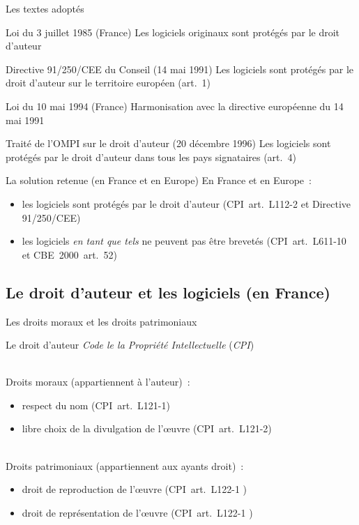\documentclass{beamer}
\begin{document}
\begin{frame}{Les textes adoptés}
    \begin{block}{Loi du 3 juillet 1985 (France)}
        Les logiciels \og{}originaux\fg{} sont protégés par le droit d'auteur
    \end{block}
    \begin{block}{Directive 91/250/CEE du Conseil (14 mai 1991)}
        Les logiciels sont protégés par le droit d'auteur sur le territoire européen (art.~1)
    \end{block}
    \begin{block}{Loi du 10 mai 1994 (France)}
        Harmonisation avec la directive européenne du 14 mai 1991
    \end{block}
    \begin{block}{Traité de l’OMPI sur le droit d’auteur (20 décembre 1996)}
        Les logiciels sont protégés par le droit d'auteur dans tous les pays signataires (art.~4)
    \end{block}
\end{frame}

\begin{frame}{La solution retenue (en France et en Europe)}
    En France et en Europe~:
    \begin{itemize}
        \item les logiciels sont protégés par le droit d'auteur (CPI~art.~L112-2 et Directive 91/250/CEE)
        \item les logiciels \emph{en tant que tels} ne peuvent pas être brevetés (CPI~art.~L611-10 et CBE~2000~art.~52)
    \end{itemize}
\end{frame}


\subsection{Le droit d’auteur et les logiciels (en France)}

\begin{frame}{Les droits moraux et les droits patrimoniaux}
    \begin{block}{Le droit d’auteur}
        \emph{Code le la Propriété Intellectuelle} (\emph{CPI})
    \end{block}
    ~\\
    Droits moraux (appartiennent à l'auteur)~:
    \begin{itemize}
        \item respect du nom (CPI~art.~L121-1)
        \item libre choix de la divulgation de l'œuvre (CPI~art.~L121-2)
    \end{itemize}
    ~\\
    Droits patrimoniaux (appartiennent aux ayants droit)~:
    \begin{itemize}
        \item droit de reproduction de l'œuvre (CPI~art.~L122-1 )
        \item droit de représentation de l'œuvre (CPI~art.~L122-1 )
    \end{itemize}
\end{frame}
\end{document}
